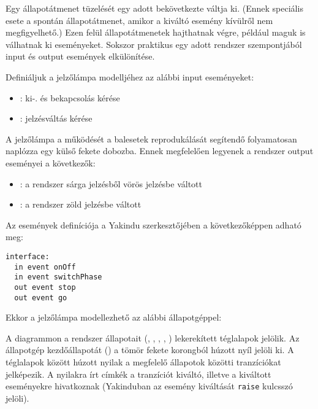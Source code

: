 Egy állapotátmenet tüzelését egy adott  bekövetkezte váltja ki. (Ennek speciális esete a spontán állapotátmenet, amikor a kiváltó esemény kívülről nem megfigyelhető.) Ezen felül állapotátmenetek  hajthatnak végre, például maguk is válhatnak ki eseményeket. Sokszor praktikus egy adott rendszer szempontjából input és output események elkülönítése.

\begin{pelda}
Definiáljuk a jelzőlámpa modelljéhez az alábbi input eseményeket:

\begin{itemize}
	\item {}: ki-. és bekapcsolás kérése
	\item {}: jelzésváltás kérése
\end{itemize}

A jelzőlámpa a működését a balesetek reprodukálását segítendő folyamatosan naplózza egy külső fekete dobozba. Ennek megfelelően legyenek a rendszer output eseményei a következők:

\begin{itemize}
	\item {}: a rendszer sárga jelzésből vörös jelzésbe váltott
	\item {}: a rendszer zöld jelzésbe váltott
\end{itemize}

Az események definíciója a Yakindu szerkesztőjében a következőképpen adható meg:

\begin{lstlisting}
interface:
  in event onOff
  in event switchPhase 
  out event stop
  out event go
\end{lstlisting}

Ekkor a jelzőlámpa modellezhető az alábbi állapotgéppel:

\end{pelda}

A diagrammon a rendszer állapotait (, , , , ) lekerekített téglalapok jelölik. Az állapotgép kezdőállapotát () a tömör fekete korongból húzott nyíl jelöli ki. A téglalapok között húzott nyilak a megfelelő állapotok közötti tranzíciókat jelképezik. A nyilakra írt címkék a tranzíciót kiváltó, illetve a kiváltott eseményekre hivatkoznak (Yakinduban az esemény kiváltását \lstinline{raise} kulcsszó jelöli).

